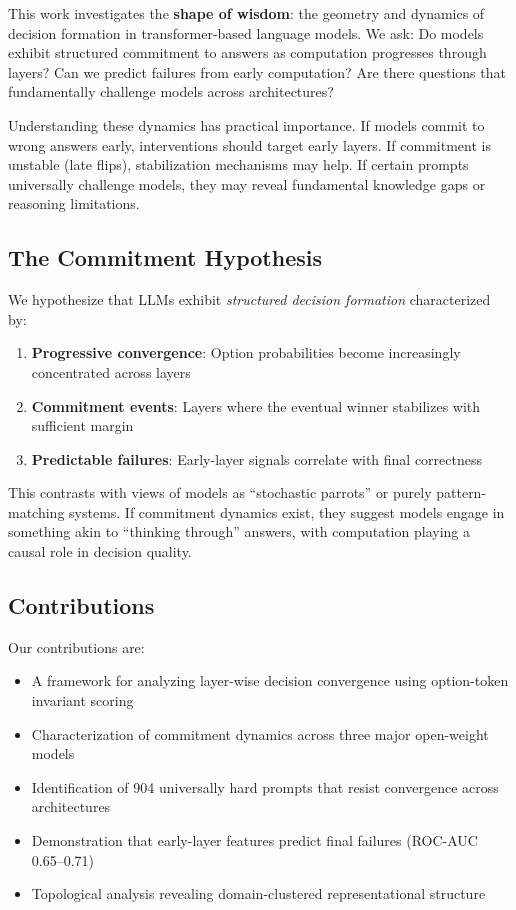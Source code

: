 \documentclass[11pt]{article}
\theoremstyle{definition}
\begin{document}
This work investigates the \textbf{shape of wisdom}: the geometry and dynamics of decision formation in transformer-based language models. We ask: Do models exhibit structured commitment to answers as computation progresses through layers? Can we predict failures from early computation? Are there questions that fundamentally challenge models across architectures?

Understanding these dynamics has practical importance. If models commit to wrong answers early, interventions should target early layers. If commitment is unstable (late flips), stabilization mechanisms may help. If certain prompts universally challenge models, they may reveal fundamental knowledge gaps or reasoning limitations.

\subsection{The Commitment Hypothesis}

We hypothesize that LLMs exhibit \textit{structured decision formation} characterized by:
\begin{enumerate}
    \item \textbf{Progressive convergence}: Option probabilities become increasingly concentrated across layers
    \item \textbf{Commitment events}: Layers where the eventual winner stabilizes with sufficient margin
    \item \textbf{Predictable failures}: Early-layer signals correlate with final correctness
\end{enumerate}

This contrasts with views of models as ``stochastic parrots'' \citep{bender2021dangers} or purely pattern-matching systems. If commitment dynamics exist, they suggest models engage in something akin to ``thinking through'' answers, with computation playing a causal role in decision quality.

\subsection{Contributions}

Our contributions are:
\begin{itemize}
    \item A framework for analyzing layer-wise decision convergence using option-token invariant scoring
    \item Characterization of commitment dynamics across three major open-weight models
    \item Identification of 904 universally hard prompts that resist convergence across architectures
    \item Demonstration that early-layer features predict final failures (ROC-AUC 0.65--0.71)
    \item Topological analysis revealing domain-clustered representational structure
\end{itemize}
\end{document}
